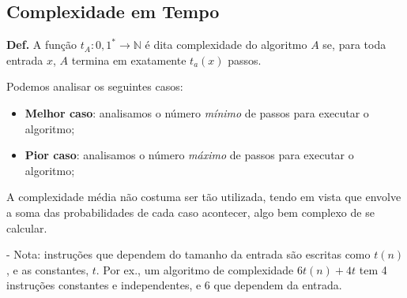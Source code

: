 \subsection{Complexidade em Tempo}
\textbf{Def.} A função $t_A : {0, 1}^* \rightarrow \mathbb{N}$ é dita complexidade do algoritmo $A$ se, para toda entrada $x$, $A$ termina em exatamente $t_a(x)$ passos.

Podemos analisar os seguintes casos:
\begin{itemize}
  \item \textbf{Melhor caso}: analisamos o número \textit{mínimo} de passos para executar o algoritmo;
  \item \textbf{Pior caso}: analisamos o número \textit{máximo} de passos para executar o algoritmo;
\end{itemize}
A complexidade média não costuma ser tão utilizada, tendo em vista que envolve a soma das probabilidades de cada caso acontecer, algo bem complexo de se calcular.

- Nota: instruções que dependem do tamanho da entrada são escritas como $t(n)$, e as constantes, $t$. Por ex., um algoritmo de complexidade $6t(n) + 4t$ tem 4 instruções constantes e independentes, e 6 que dependem da entrada.
